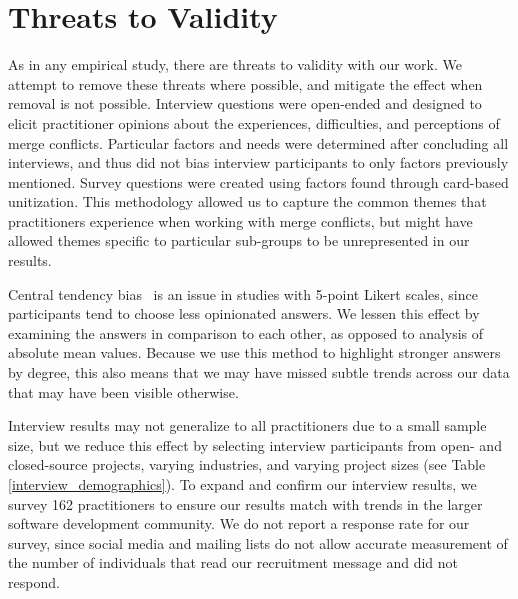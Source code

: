 \section{Threats to Validity}\label{threats}
As in any empirical study, there are threats to validity with our work.
We attempt to remove these threats where possible, and mitigate the effect when removal is not possible.
Interview questions were open-ended and designed to elicit practitioner opinions about the experiences, difficulties, and perceptions of merge conflicts.
Particular factors and needs were determined after concluding all interviews, and thus did not bias interview participants to only factors previously mentioned.
Survey questions were created using factors found through card-based unitization.
This methodology allowed us to capture the common themes that practitioners experience when working with merge conflicts, but might have allowed themes specific to particular sub-groups to be unrepresented in our results.

Central tendency bias~\cite{guilford1954psychometric} is an issue in studies with 5-point Likert scales, since participants tend to choose less opinionated answers.
We lessen this effect by examining the answers in comparison to each other, as opposed to analysis of absolute mean values.
Because we use this method to highlight stronger answers by degree, this also means that we may have missed subtle trends across our data that may have been visible otherwise.

Interview results may not generalize to all practitioners due to a small sample size, but we reduce this effect by selecting interview participants from open- and closed-source projects, varying industries, and varying project sizes (see Table \ref{interview_demographics}).
To expand and confirm our interview results, we survey 162 practitioners to ensure our results match with trends in the larger software development community.
We do not report a response rate for our survey, since social media and mailing lists do not allow accurate measurement of the number of individuals that read our recruitment message and did not respond.




